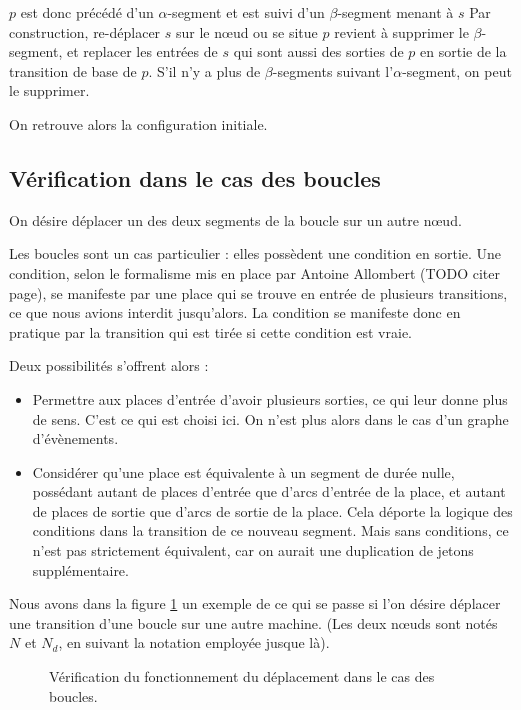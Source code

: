 $p$ est donc précédé d'un $\alpha$-segment et est suivi d'un $\beta$-segment menant à $s$
Par construction, re-déplacer $s$ sur le nœud ou se situe $p$ revient à supprimer le $\beta$-segment, et replacer les entrées de $s$ qui sont aussi des sorties de $p$ en sortie de la transition de base de $p$. S'il n'y a plus de $\beta$-segments suivant l'$\alpha$-segment, on peut le supprimer.

On retrouve alors la configuration initiale.

\subsection{Vérification dans le cas des boucles}
On désire déplacer un des deux segments de la boucle sur un autre nœud.

Les boucles sont un cas particulier : elles possèdent une condition en sortie.
Une condition, selon le formalisme mis en place par Antoine Allombert (TODO citer page), se manifeste par une place qui se trouve en entrée de plusieurs transitions, ce que nous avions interdit jusqu'alors. La condition se manifeste donc en pratique par la transition qui est tirée si cette condition est vraie.

Deux possibilités s'offrent alors : 
\begin{itemize}
\item Permettre aux places d'entrée d'avoir plusieurs sorties, ce qui leur donne plus de sens. C'est ce qui est choisi ici. On n'est plus alors dans le cas d'un graphe d'évènements.
\item Considérer qu'une place est équivalente à un segment de durée nulle, possédant autant de places d'entrée que d'arcs d'entrée de la place, et autant de places de sortie que d'arcs de sortie de la place. Cela déporte la logique des conditions dans la transition de ce nouveau segment. Mais sans conditions, ce n'est pas strictement équivalent, car on aurait une duplication de jetons supplémentaire.
\end{itemize}

Nous avons dans la figure \ref{fig:verifBoucles} un exemple de ce qui se passe si l'on désire déplacer une transition d'une boucle sur une autre machine. (Les deux nœuds sont notés $N$ et $N_d$, en suivant la notation employée jusque là).

\begin{figure}[H]
\centering

\caption{Vérification du fonctionnement du déplacement dans le cas des boucles.}
\label{fig:verifBoucles}
\end{figure}


